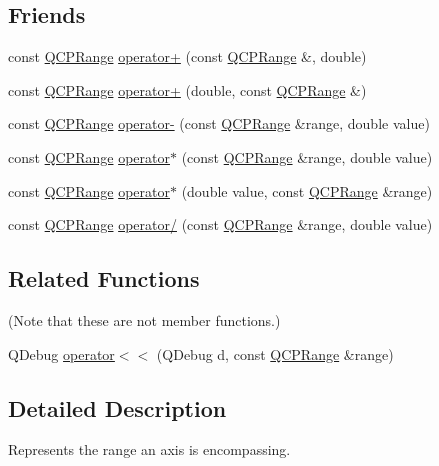 \subsection*{Friends}
\begin{DoxyCompactItemize}
\item 
const \hyperlink{classQCPRange}{Q\+C\+P\+Range} \hyperlink{classQCPRange_af53ea6fb823a4a5897162b865841de04}{operator+} (const \hyperlink{classQCPRange}{Q\+C\+P\+Range} \&, double)
\item 
const \hyperlink{classQCPRange}{Q\+C\+P\+Range} \hyperlink{classQCPRange_a9fb2e9941d32001482df670c0d704977}{operator+} (double, const \hyperlink{classQCPRange}{Q\+C\+P\+Range} \&)
\item 
const \hyperlink{classQCPRange}{Q\+C\+P\+Range} \hyperlink{classQCPRange_a797f82830b516646da8873f82e39e356}{operator-\/} (const \hyperlink{classQCPRange}{Q\+C\+P\+Range} \&range, double value)
\item 
const \hyperlink{classQCPRange}{Q\+C\+P\+Range} \hyperlink{classQCPRange_a558b1248ff6a9e41fd5b2630555a8acc}{operator$\ast$} (const \hyperlink{classQCPRange}{Q\+C\+P\+Range} \&range, double value)
\item 
const \hyperlink{classQCPRange}{Q\+C\+P\+Range} \hyperlink{classQCPRange_a5cb2332f6957021f47cc768089f4f090}{operator$\ast$} (double value, const \hyperlink{classQCPRange}{Q\+C\+P\+Range} \&range)
\item 
const \hyperlink{classQCPRange}{Q\+C\+P\+Range} \hyperlink{classQCPRange_a4b366a3a21974c88e09b0d39d4a24a4b}{operator/} (const \hyperlink{classQCPRange}{Q\+C\+P\+Range} \&range, double value)
\end{DoxyCompactItemize}
\subsection*{Related Functions}
(Note that these are not member functions.) \begin{DoxyCompactItemize}
\item 
Q\+Debug \hyperlink{classQCPRange_ab4b7d434541ec2e2e00ef3764dde90d8}{operator$<$$<$} (Q\+Debug d, const \hyperlink{classQCPRange}{Q\+C\+P\+Range} \&range)
\end{DoxyCompactItemize}


\subsection{Detailed Description}
Represents the range an axis is encompassing. 

